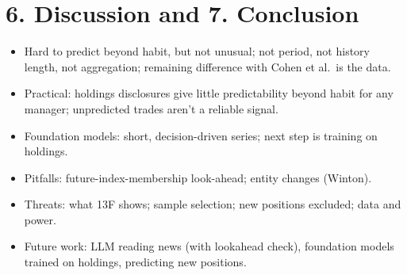 \documentclass[11pt]{article}
\begin{document}
\section*{6. Discussion and 7. Conclusion}
\begin{itemize}
  \item Hard to predict beyond habit, but not unusual; not period, not history
  length, not aggregation; remaining difference with Cohen et al.\ is the data.
  \item Practical: holdings disclosures give little predictability beyond habit
  for any manager; unpredicted trades aren't a reliable signal.
  \item Foundation models: short, decision-driven series; next step is
  training on holdings.
  \item Pitfalls: future-index-membership look-ahead; entity changes (Winton).
  \item Threats: what 13F shows; sample selection; new positions excluded;
  data and power.
  \item Future work: LLM reading news (with lookahead check), foundation models
  trained on holdings, predicting new positions.
\end{itemize}
\end{document}
